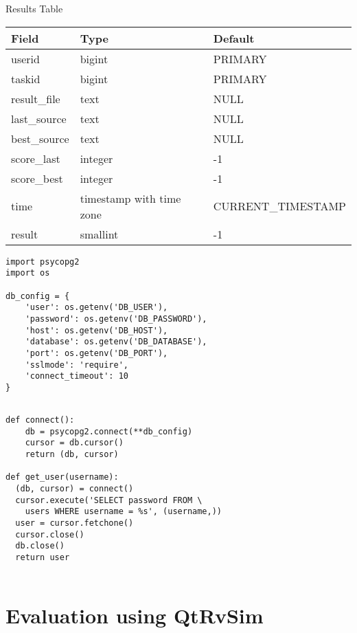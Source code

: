 \documentclass{beamer}
\begin{document}
		\begin{frame}{Results Table}
			\small
			\begin{tabular}{|l|l|l|}
			\hline
			Field & Type & Default \\
			\hline
			userid & bigint & PRIMARY \\
			taskid & bigint & PRIMARY \\
			result\_file & text & NULL \\
			last\_source & text & NULL \\
			best\_source & text & NULL \\
			score\_last & integer & -1 \\
			score\_best & integer & -1 \\
			time & timestamp with time zone & CURRENT\_TIMESTAMP \\
			result & smallint & -1 \\
			\hline
			\end{tabular}
		\end{frame}

		\begin{frame}[fragile]
			\begin{verbatim}
import psycopg2
import os

db_config = {
	'user': os.getenv('DB_USER'),
	'password': os.getenv('DB_PASSWORD'),
	'host': os.getenv('DB_HOST'),
	'database': os.getenv('DB_DATABASE'),
	'port': os.getenv('DB_PORT'),
	'sslmode': 'require',
	'connect_timeout': 10
}
			\end{verbatim}
		\end{frame}

		\begin{frame}[fragile]
			\begin{verbatim}

def connect():
	db = psycopg2.connect(**db_config)
	cursor = db.cursor()
	return (db, cursor)

def get_user(username):
  (db, cursor) = connect()
  cursor.execute('SELECT password FROM \
	users WHERE username = %s', (username,))
  user = cursor.fetchone()
  cursor.close()
  db.close()
  return user
	
			\end{verbatim}
		\end{frame}

		\section{Evaluation using QtRvSim}
\end{document}
